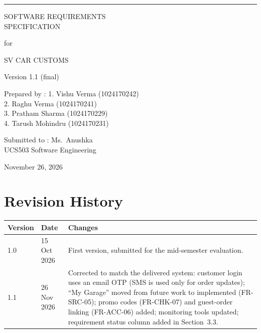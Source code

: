\documentclass[11pt,a4paper]{article}
\begin{document}
\begin{titlepage}
  \vspace*{10mm}
  \noindent\rule{\linewidth}{4pt}\par
  \vspace{18mm}
  \begin{flushright}\bfseries
    {\Huge SOFTWARE REQUIREMENTS\\[4pt] SPECIFICATION\par}
    \vspace{14mm}
    {\Huge for\par}
    \vspace{14mm}
    {\Huge SV CAR CUSTOMS\par}
    \vspace{10mm}
    {\large Version 1.1 (final)\par}
    \vspace{18mm}
    {\large Prepared by : 1. Vishu Verma (1024170242)\\
     2. Raghu Verma (1024170241)\\
     3. Pratham Sharma (1024170229)\\
     4. Tarush Mohindru (1024170231)\par}
    \vspace{14mm}
    {\large Submitted to : Ms.\ Anushka\\
     UCS503 Software Engineering\par}
    \vspace{14mm}
    {\large November 26, 2026\par}
  \end{flushright}
\end{titlepage}

\tableofcontents
\clearpage

\section*{Revision History}
\begin{tabularx}{\linewidth}{@{}l l X@{}}
\toprule
\textbf{Version} & \textbf{Date} & \textbf{Changes} \\
\midrule
1.0 & 15 Oct 2026 & First version, submitted for the mid-semester evaluation. \\
1.1 & 26 Nov 2026 & Corrected to match the delivered system: customer login uses an
email OTP (SMS is used only for order updates); ``My Garage'' moved from future work to
implemented (FR-SRC-05); promo codes (FR-CHK-07) and guest-order linking (FR-ACC-06)
added; monitoring tools updated; requirement status column added in Section~3.3. \\
\bottomrule
\end{tabularx}
\end{document}
